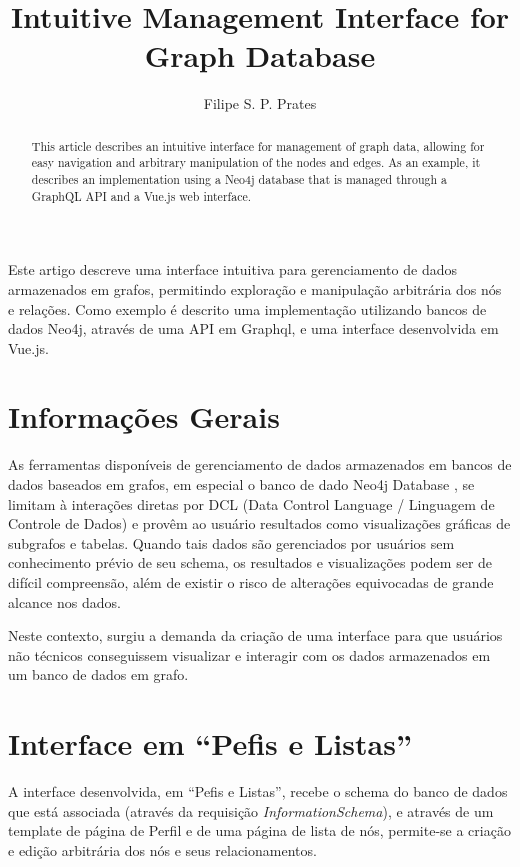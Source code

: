 \documentclass[12pt]{article}
\title{Intuitive Management Interface for Graph Database}
\author{Filipe S. P. Prates\inst{1} }
\begin{document}
 

\maketitle

\begin{abstract}
This article describes an intuitive interface for management of graph data, allowing for easy navigation and arbitrary manipulation of the nodes and edges. As an example, it describes an implementation using a Neo4j database that is managed through a GraphQL API and a Vue.js web interface. 

\end{abstract}

\begin{resumo}   Este artigo descreve uma interface intuitiva para gerenciamento de dados armazenados em grafos, permitindo exploração e manipulação arbitrária dos nós e relações. Como exemplo é descrito uma implementação utilizando bancos de dados Neo4j, através de uma API em Graphql, e uma interface desenvolvida em Vue.js.

\end{resumo}


\section{Informações Gerais}

As ferramentas disponíveis de gerenciamento de dados armazenados em bancos de dados baseados em grafos, em especial o banco de dado Neo4j Database \cite{Neo4j}, se limitam à interações diretas por DCL (Data Control Language / Linguagem de Controle de Dados) \cite{Cypher} e provêm ao usuário resultados como visualizações gráficas de subgrafos e tabelas. Quando tais dados são gerenciados por usuários sem conhecimento prévio de seu schema, os resultados e visualizações podem ser de difícil compreensão, além de existir o risco de alterações equivocadas de grande alcance nos dados.

Neste contexto, surgiu a demanda da criação de uma interface para que usuários não técnicos conseguissem visualizar e interagir com os dados armazenados em um banco de dados em grafo.

\section{Interface em ``Pefis e Listas''}

A interface desenvolvida, em ``Pefis e Listas'', recebe o schema do banco de dados que está associada (através da requisição \textit{InformationSchema}), e através de um template de página de Perfil e de uma página de lista de nós, permite-se a criação e edição arbitrária dos nós e seus relacionamentos.
\end{document}
